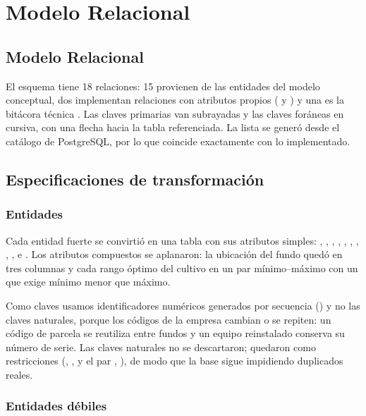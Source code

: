 \section{Modelo Relacional}

\subsection{Modelo Relacional}

El esquema tiene 18 relaciones: 15 provienen de las entidades del modelo conceptual, dos implementan relaciones con atributos propios ( y ) y una es la bitácora técnica . Las claves primarias van subrayadas y las claves foráneas en cursiva, con una flecha hacia la tabla referenciada. La lista se generó desde el catálogo de PostgreSQL, por lo que coincide exactamente con lo implementado.


\subsection{Especificaciones de transformación}

\subsubsection{Entidades}

Cada entidad fuerte se convirtió en una tabla con sus atributos simples: , , , , , , , , ,  e . Los atributos compuestos se aplanaron: la ubicación del fundo quedó en tres columnas y cada rango óptimo del cultivo en un par mínimo--máximo con un  que exige mínimo menor que máximo.

Como claves usamos identificadores numéricos generados por secuencia () y no las claves naturales, porque los códigos de la empresa cambian o se repiten: un código de parcela se reutiliza entre fundos y un equipo reinstalado conserva su número de serie. Las claves naturales no se descartaron; quedaron como restricciones  (, ,  y el par , ), de modo que la base sigue impidiendo duplicados reales.

\subsubsection{Entidades débiles}


